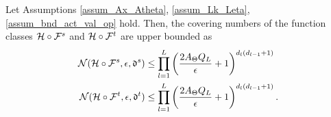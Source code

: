 \documentclass[review,supplement,onefignum,onetabnum]{siamonline250211}
\begin{document}
\begin{lemma} 
    \label{lem_cov_num_HFs_HFt}
    Let Assumptions \ref{assum_Ax_Atheta}, \ref{assum_Lk_Leta}, \ref{assum_bnd_act_val_op} hold. Then, the covering numbers of the function classes $\mathcal{H} \circ \mathcal{F}^s$ and $\mathcal{H} \circ \mathcal{F}^t$ are upper bounded as 
    \begin{equation*}
    \begin{split}
    \mathcal{N}( \mathcal{H} \circ \mathcal{F}^s, \epsilon, \mathfrak{d}^s) &\leq    \prod_{l=1}^{L}  \left( \frac{2 {A_\Theta} {Q_L}}{\epsilon}+1  \right)^{ {d_l}({d_{l-1}}+1) } \\
    \mathcal{N}( \mathcal{H} \circ \mathcal{F}^t, \epsilon, \mathfrak{d}^t) & \leq  \prod_{l=1}^{L}  \left( \frac{2 {A_\Theta} {Q_L}}{\epsilon}+1  \right)^{ {d_l}({d_{l-1}}+1) }.
    \end{split}
    \end{equation*}
\end{lemma}
\end{document}
